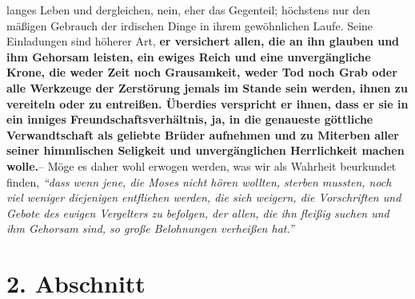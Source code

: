 langes Leben und dergleichen, nein, eher das Gegenteil; höchstens nur den
mäßigen Gebrauch der irdischen Dinge in ihrem gewöhnlichen Laufe. Seine
Einladungen sind höherer Art,
\label{ref:16_01_warum_2}
\textbf{er versichert allen, die an ihn glauben und ihm
Gehorsam leisten, ein ewiges Reich und eine unvergängliche
Krone, die weder
Zeit noch Grausamkeit, weder Tod noch Grab oder alle Werkzeuge der Zerstörung
jemals im Stande sein werden, ihnen zu vereiteln oder zu entreißen. Überdies
verspricht er ihnen, dass er sie in ein inniges Freundschaftsverhältnis, ja, in
die genaueste göttliche Verwandtschaft als geliebte Brüder aufnehmen und zu
Miterben aller seiner himmlischen Seligkeit und unvergänglichen
Herrlichkeit
machen wolle.}-- Möge es daher wohl erwogen werden, was wir als Wahrheit
beurkundet finden,
\textit{"`dass wenn jene, die Moses nicht hören wollten, sterben
mussten, noch viel weniger diejenigen entfliehen werden, die sich weigern, die
Vorschriften und Gebote des ewigen Vergelters zu befolgen, der allen, die ihn
fleißig suchen und ihm Gehorsam sind, so große Belohnungen verheißen
hat."'}

\section{2. Abschnitt} \label{kap16_ab2}

